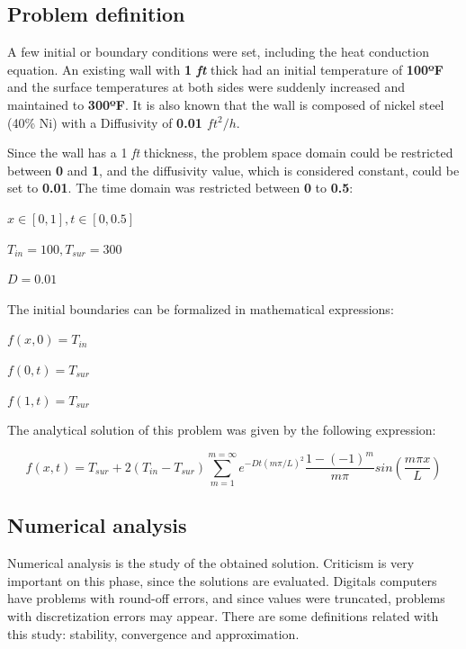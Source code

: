 \documentclass[12pt]{report}
\begin{document}
\subsection*{Problem definition}
A few initial or boundary conditions were set, including the heat conduction equation. An existing wall with \textbf{1 \textit{ft}} thick had an initial temperature of \textbf{100ºF} and the surface temperatures at both sides were suddenly increased and maintained to \textbf{300ºF}. It is also known that the wall is composed of nickel steel (40\% Ni) with a Diffusivity of \textbf{0.01 $ft ^2/h$}.
\par
Since the wall has a 1 \textit{ft} thickness, the problem space domain could be restricted between \textbf{0} and \textbf{1}, and the diffusivity value, which is considered constant, could be set to \textbf{0.01}. The time domain was restricted between \textbf{0} to \textbf{0.5}:
\begin{center}
\normalsize
$
x \in [0, 1], t \in [0, 0.5]
$
\end{center}
\begin{center}
\normalsize
$
T_{in} = 100, T_{sur} = 300
$
\end{center}
\begin{center}
\normalsize
$
D = 0.01
$
\end{center}
\par 
The initial boundaries can be formalized in mathematical expressions:
\begin{center}
\normalsize
$
f(x,0) = T_{in}
$
\end{center}
\begin{center}
\normalsize
$
f(0,t) = T_{sur}
$
\end{center}
\begin{center}
\normalsize
$
f(1,t) = T_{sur}
$
\end{center}
\par
The analytical solution of this problem was given by the following expression:
\begin{center}
\normalsize
$$
f(x,t) = T_{sur} + 2(T_{in} - T_{sur}) \sum_{m=1}^{m=\infty} 
e ^{-D t (m \pi / L) ^2}  \frac{1 - (-1)^m}{m \pi} sin \left(\frac{m \pi x}{L}\right)$$  

\end{center}

\subsection*{Numerical analysis}
\par Numerical analysis is the study of the obtained solution. Criticism is very important on this phase, since the solutions are evaluated. Digitals computers have problems with round-off errors, and since values were truncated, problems with discretization errors may appear. There are some definitions related with this study: stability, convergence and approximation.
\end{document}
